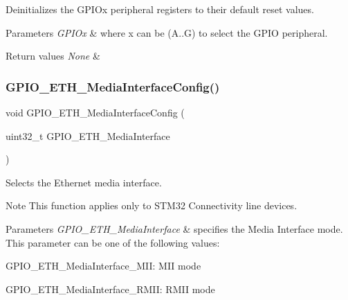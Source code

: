 Deinitializes the G\+P\+I\+Ox peripheral registers to their default reset values. 


\begin{DoxyParams}{Parameters}
{\em G\+P\+I\+Ox} & where x can be (A..G) to select the G\+P\+IO peripheral. \\
\hline
\end{DoxyParams}

\begin{DoxyRetVals}{Return values}
{\em None} & \\
\hline
\end{DoxyRetVals}
\mbox{\label{group___g_p_i_o___exported___functions_gacbfad958f684347be0f2c762dc85c3c2}} 
\subsubsection{\texorpdfstring{GPIO\_ETH\_MediaInterfaceConfig()}{GPIO\_ETH\_MediaInterfaceConfig()}}
{\footnotesize\ttfamily void G\+P\+I\+O\+\_\+\+E\+T\+H\+\_\+\+Media\+Interface\+Config (\begin{DoxyParamCaption}\item[{uint32\+\_\+t}]{G\+P\+I\+O\+\_\+\+E\+T\+H\+\_\+\+Media\+Interface }\end{DoxyParamCaption})}



Selects the Ethernet media interface. 

\begin{DoxyNote}{Note}
This function applies only to S\+T\+M32 Connectivity line devices.
\end{DoxyNote}

\begin{DoxyParams}{Parameters}
{\em G\+P\+I\+O\+\_\+\+E\+T\+H\+\_\+\+Media\+Interface} & specifies the Media Interface mode. This parameter can be one of the following values\+: \begin{DoxyItemize}
\item G\+P\+I\+O\+\_\+\+E\+T\+H\+\_\+\+Media\+Interface\+\_\+\+M\+II\+: M\+II mode \item G\+P\+I\+O\+\_\+\+E\+T\+H\+\_\+\+Media\+Interface\+\_\+\+R\+M\+II\+: R\+M\+II mode\end{DoxyItemize}
\\
\hline
\end{DoxyParams}

